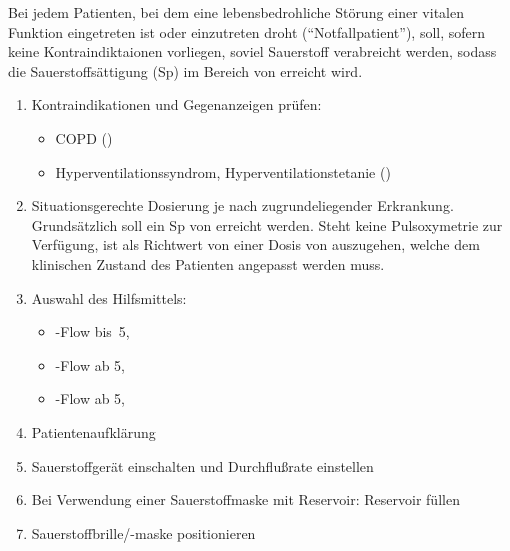 \label{m:sauerstoffberieselung}
Bei jedem Patienten, bei dem eine
lebensbedrohliche Störung einer vitalen Funktion eingetreten
ist oder einzutreten droht (\enquote{Notfallpatient}), soll,
sofern keine Kontraindiktaionen vorliegen, soviel Sauerstoff
verabreicht werden, sodass die Sauerstoffsättigung
(Sp) im Bereich von  erreicht wird.

\begin{enumerate}
  \item Kontraindikationen und Gegenanzeigen prüfen:
  \begin{itemize}
    \item COPD ()
    \item Hyperventilationssyndrom, Hyperventilationstetanie
    ()
  \end{itemize}
  \item Situationsgerechte Dosierung je nach
  zugrundeliegender Erkrankung. Grundsätzlich soll ein
  Sp von
 erreicht werden. Steht keine Pulsoxymetrie zur Verfügung, ist als
Richtwert von einer Dosis von \EE{8\LPerMin*} auszugehen,
welche dem klinischen Zustand des Patienten angepasst werden
muss.
  \item Auswahl des Hilfsmittels:
  \begin{itemize}
    \item {}
    -Flow bis~5\LPerMin*,
    \item {}
    -Flow ab 5\LPerMin*,
    \item {} -Flow ab 5\LPerMin*,
  \end{itemize}
  \item Patientenaufklärung
  \item Sauerstoffgerät einschalten und Durchflußrate
  einstellen
  \item Bei Verwendung einer Sauerstoff\-maske mit
  Reservoir: Reservoir füllen
  \item Sauerstoffbrille/-maske positionieren 
\end{enumerate} 

\cite{AsboeLehrmeinungRd2011-09}